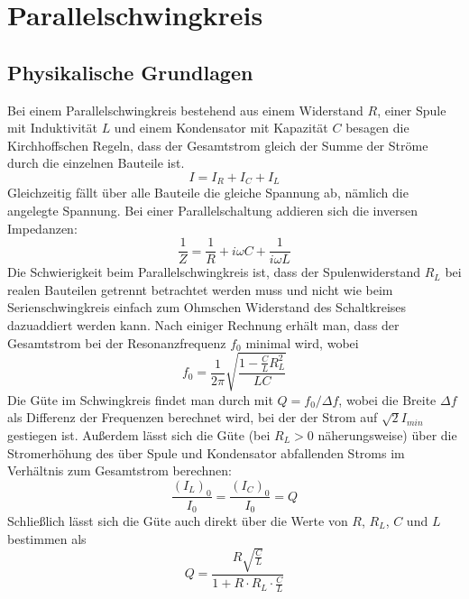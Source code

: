 \documentclass[12pt,a4paper]{article}
\begin{document}
	
\newpage
\section{Parallelschwingkreis}
\subsection{Physikalische Grundlagen}
Bei einem Parallelschwingkreis bestehend aus einem Widerstand $R$, einer Spule mit Induktivität $L$ und einem Kondensator mit Kapazität $C$ besagen die Kirchhoffschen Regeln, dass der Gesamtstrom gleich der Summe der Ströme durch die einzelnen Bauteile ist.
\begin{equation}
I=I_R+I_C+I_L
\end{equation}
Gleichzeitig fällt über alle Bauteile die gleiche Spannung ab, nämlich die angelegte Spannung. Bei einer Parallelschaltung addieren sich die inversen Impedanzen:
\begin{equation}
\frac{1}{Z}=\frac{1}{R}+i\omega C+\frac{1}{i\omega L}
\end{equation}
Die Schwierigkeit beim Parallelschwingkreis ist, dass der Spulenwiderstand $R_L$ bei realen Bauteilen getrennt betrachtet werden muss und nicht wie beim Serienschwingkreis einfach zum Ohmschen Widerstand des Schaltkreises dazuaddiert werden kann. Nach einiger Rechnung erhält man, dass der Gesamtstrom bei der Resonanzfrequenz $f_0$ minimal wird, wobei
\begin{equation}
f_0=\frac{1}{2\pi}\sqrt{\frac{1-\frac{C}{L}R_L^2}{LC}}
\end{equation}
Die Güte im Schwingkreis findet man durch mit $Q=f_0/\Delta f$, wobei die Breite $\Delta f$ als Differenz der Frequenzen berechnet wird, bei der der Strom auf $\sqrt{2}I_{min}$ gestiegen ist. Außerdem lässt sich die Güte (bei $R_L>0$ näherungsweise) über die Stromerhöhung des über Spule und Kondensator abfallenden Stroms im Verhältnis zum Gesamtstrom berechnen:
\begin{equation}
\frac{(I_L)_0}{I_0}=\frac{(I_C)_0}{I_0}=Q
\end{equation}  
Schließlich lässt sich die Güte auch direkt über die Werte von $R$, $R_L$, $C$ und $L$ bestimmen als 
\begin{equation}\label{eq:guete_parallelschaltkreis}
Q=\frac{R\sqrt{\frac{C}{L}}}{1+R\cdot R_L\cdot \frac{C}{L}}
\end{equation}
\end{document}
